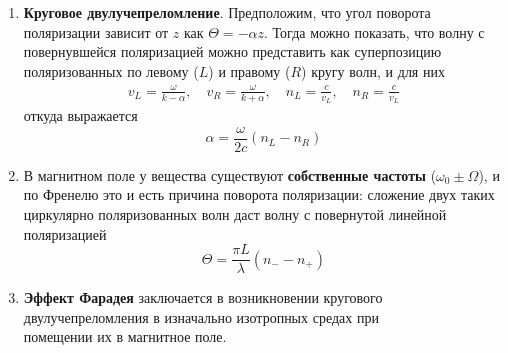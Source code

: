 \documentclass[10pt,pdf,hyperref={unicode}, dvipsnames, handout]{beamer}
\begin{document}
\begin{frame}[t]
	\begin{enumerate}
		\item \textbf{Круговое двулучепреломление}. Предположим, что угол поворота поляризации зависит от $z$ как 
$\Theta=-\alpha z$. Тогда можно показать, что волну с повернувшейся поляризацией можно представить как суперпозицию поляризованных по левому ($L$) и правому ($R$) кругу волн, и для них
\begin{gather*}
	v_L=\frac{\omega}{k-\alpha},
	\quad
	v_R=\frac{\omega}{k+\alpha},
	\quad
	n_L=\frac{c}{v_L},
	\quad
	n_R=\frac{c}{v_L}
\end{gather*}
откуда выражается
\begin{equation*}
	\alpha=\frac{\omega}{2c}(n_L-n_R)
\end{equation*}
\item В магнитном поле у вещества существуют \textbf{собственные частоты} ($\omega_0\pm\Omega$),
и по Френелю это и есть причина поворота поляризации: сложение двух таких циркулярно поляризованных волн даст волну с повернутой линейной поляризацией
\begin{equation*}
	\Theta=\frac{\pi L}{\lambda}(n_--n_+)
\end{equation*}
		\item \textbf{Эффект Фарадея} заключается в возникновении кругового двулучепреломления в изначально изотропных средах при \\помещении их в магнитное поле. 
	\end{enumerate}
			
			
\end{frame}
\end{document}
